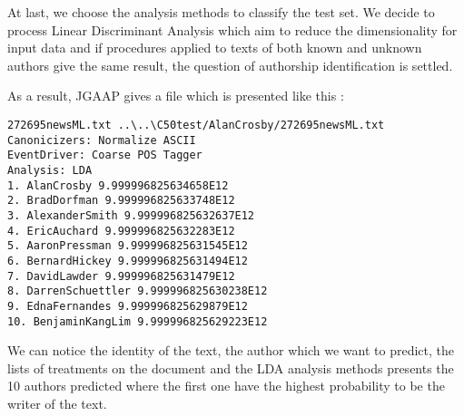 At last, we choose the analysis methods to classify the test set.
We decide to process Linear Discriminant Analysis which aim to reduce the dimensionality for input data and if procedures applied to texts of both known and unknown authors give the same
result, the question of authorship identification is settled.

As a result, JGAAP gives a file which is presented like this :
\begin{verbatim}
272695newsML.txt ..\..\C50test/AlanCrosby/272695newsML.txt
Canonicizers: Normalize ASCII 
EventDriver: Coarse POS Tagger 
Analysis: LDA 
1. AlanCrosby 9.999996825634658E12
2. BradDorfman 9.999996825633748E12
3. AlexanderSmith 9.999996825632637E12
4. EricAuchard 9.999996825632283E12
5. AaronPressman 9.999996825631545E12
6. BernardHickey 9.999996825631494E12
7. DavidLawder 9.999996825631479E12
8. DarrenSchuettler 9.999996825630238E12
9. EdnaFernandes 9.999996825629879E12
10. BenjaminKangLim 9.999996825629223E12
\end{verbatim}

We can notice the identity of the text, the author which we want to predict, the lists of treatments on the document and the LDA analysis methods presents the 10 authors predicted where the first one have the highest probability to be the writer of the text.